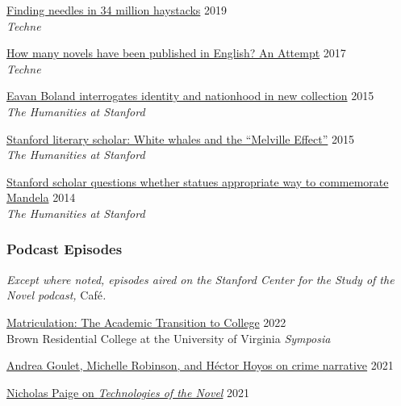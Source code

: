 \documentclass[
  12pt,
  letterpaper,
]{article}
\begin{document}
\href{https://web.archive.org/web/20220430054802/https://litlab.stanford.edu/finding-needles-in-34-million-haystacks/}{Finding
needles in 34 million haystacks} \hfill 2019\\
\emph{Techne}

\href{https://web.archive.org/web/20220323072937/https://litlab.stanford.edu/how-many-novels-have-been-published-in-english-an-attempt/}{How
many novels have been published in English? An Attempt} \hfill 2017\\
\emph{Techne}

\href{https://web.archive.org/web/20210810123746/https://news.stanford.edu/news/2015/february/boland-country-book-022615.html}{Eavan
Boland interrogates identity and nationhood in new collection}
\hfill 2015\\
\emph{The Humanities at Stanford}

\href{https://web.archive.org/web/20210810125202/https://news.stanford.edu/news/2015/may/melville-scholar-boone-051115.html}{Stanford
literary scholar: White whales and the ``Melville Effect''}
\hfill 2015\\
\emph{The Humanities at Stanford}

\href{https://web.archive.org/web/20220611230152/https://news.stanford.edu/pr/2014/pr-mandela-statue-parker-120314.html}{Stanford
scholar questions whether statues appropriate way to commemorate
Mandela} \hfill 2014\\
\emph{The Humanities at Stanford}

\hypertarget{podcast-episodes}{%
\subsubsection{Podcast Episodes}\label{podcast-episodes}}

\emph{Except where noted, episodes aired on the Stanford Center
for the Study of the Novel podcast, }Café\emph{.}

\href{https://virginiaaudio.org/\#/symposia/}{Matriculation: The
Academic Transition to College} \hfill 2022\\
Brown Residential College at the University of
Virginia \emph{Symposia}

\href{https://web.archive.org/web/20220429010015/https://novel.stanford.edu/csn-cafe/2021/7/23/crime-narratives-with-andrea-goulet-michelle-robinson-and-hctor-hoyos-43021-je87a}{Andrea
Goulet, Michelle Robinson, and Héctor Hoyos on crime narrative}
\hfill 2021

\href{https://web.archive.org/web/20220429093420/https://novel.stanford.edu/csn-cafe/2021/7/23/nicholas-paige-technologies-of-the-novel-2821}{Nicholas
Paige on \emph{Technologies of the Novel}} \hfill 2021
\end{document}
